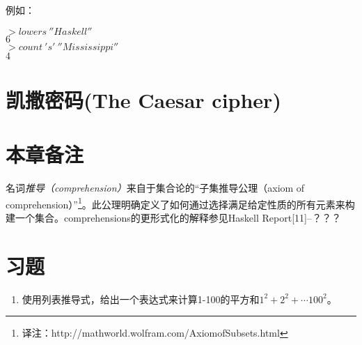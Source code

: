 例如：

\noindent\hspace*{1cm}$>lowers~''Haskell''$\\
\hspace*{1cm}$6$\\

\noindent\hspace*{1cm}$>count~'s'~''Mississippi''$\\
\hspace*{1cm}$4$\\

\section{凯撒密码(The Caesar cipher)}


\section{本章备注}
名词\textit{推导（comprehension）}来自于集合论的“子集推导公理（axiom of comprehension）”\footnote{译注：http://mathworld.wolfram.com/AxiomofSubsets.html}。此公理明确定义了如何通过选择满足给定性质的所有元素来构建一个集合。comprehensions的更形式化的解释参见Haskell Report[11]--？？？

\section{习题}

\begin{enumerate}
  \item 使用列表推导式，给出一个表达式来计算1-100的平方和$1^2 + 2^2 +\cdots 100^2$。
\end{enumerate}






